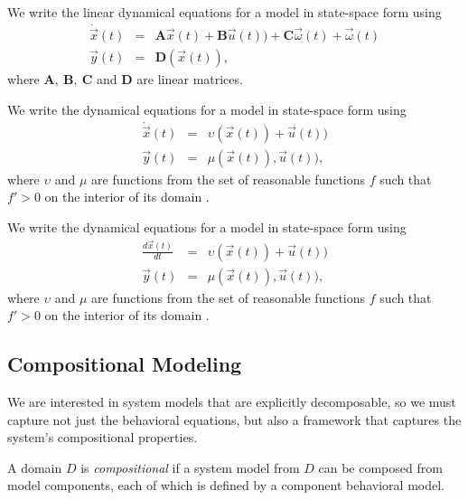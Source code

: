 \begin{definition}
We write the linear dynamical equations for a model in state-space form using
\begin{eqnarray}\label{linear-model}
\dot{\vec{x}}(t) & = & \mathbf{A} \vec{x}(t) + \mathbf{B} \vec{u}(t)) + \mathbf{C} \vec{\omega}(t) +  \vec{\omega}(t)\\
\vec{y}(t) & = & \mathbf{D} (\vec{x}(t)),
\end{eqnarray}
where $\mathbf{A}, ~ \mathbf{B},~\mathbf{C}$ and $\mathbf{D}$ are linear matrices.
\end{definition}

\begin{definition}
We write the dynamical equations for a model in state-space form using
\begin{eqnarray}\label{qual-model}
\dot{\vec{x}}(t) & = & \upsilon (\vec{x}(t)) + \vec{u}(t))\\
\vec{y}(t) & = & \mu (\vec{x}(t)), \vec{u}(t)),
\end{eqnarray}
where $\upsilon$ and $\mu$ are  functions from the set of reasonable functions $f$ such that $f' > 0$ on the interior of its domain \citep{kuipers1994composition}.
\end{definition}

\begin{definition}
We write the dynamical equations for a model in state-space form using
\begin{eqnarray}\label{boolean-model}
\frac{d \vec{x}(t)}{dt} & = & \upsilon (\vec{x}(t)) + \vec{u}(t))\\
\vec{y}(t) & = & \mu (\vec{x}(t)), \vec{u}(t)),
\end{eqnarray}
where $\upsilon$ and $\mu$ are  functions from the set of reasonable functions $f$ such that $f' > 0$ on the interior of its domain \citep{kuipers1994composition}.
\end{definition}

\subsection{Compositional Modeling}
%
We are interested in system models that are explicitly decomposable,
so we must capture not just the behavioral equations, but also a
framework that captures the system's compositional properties.


A domain $D$ is \textit{compositional} if a system model from $D$ can
be composed from model components, each of which is defined by a
component behavioral model.

